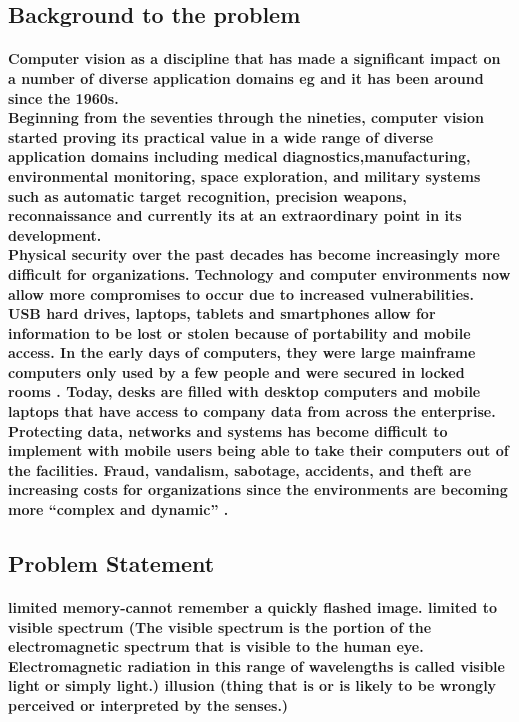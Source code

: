 \documentclass[11pt]{article}
\begin{document}
	 \subsection{\textbf{Background to the problem}}
	  \paragraph{\textmd{Computer vision as a discipline that has made
	 a significant impact on a number of diverse application domains eg \cite{DUMMY:1} and it has been around since the 1960s.\\ Beginning from the seventies through the nineties, computer vision started proving its practical value in a wide range of diverse application domains including medical diagnostics,manufacturing, environmental monitoring, space exploration, and military systems such as automatic target recognition, precision weapons, reconnaissance\cite{DUMMY:3} and currently its at an extraordinary point in its development.\\Physical security over  the past decades has become increasingly more difficult for organizations. Technology and computer environments now allow more compromises to occur
	 due to increased vulnerabilities. USB hard drives, laptops, tablets and smartphones allow for information to be lost or stolen because of portability and mobile access. In the early days of
	 computers, they were large mainframe computers only used by a few people and were secured in locked rooms \cite{DUMMY:2}. Today, desks are filled with desktop computers and mobile laptops that have access to company data from across the enterprise. Protecting data, networks and systems has become difficult to implement with mobile users being able to take their computers out of the facilities. Fraud, vandalism, sabotage, accidents, and theft are increasing costs for organizations since the environments are becoming more “complex and dynamic” \cite{DUMMY:2}.}}
	  
	 \subsection{\textbf{Problem Statement}}
	 
	 \paragraph{\textmd{limited memory-cannot remember a quickly flashed image. 
	 limited to visible spectrum (The visible spectrum is the portion of the electromagnetic spectrum that is visible to the human eye. Electromagnetic radiation in this range of wavelengths is called visible light or simply light.)	
	 illusion (thing that is or is likely to be wrongly perceived or interpreted by the senses.)}}
	 
\end{document}
